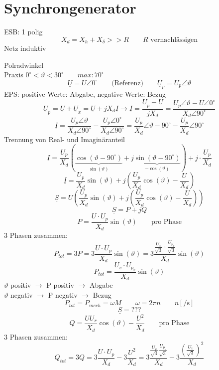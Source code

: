 \documentclass[a4,paper,fleqn]{article}
\begin{document}
\section{Synchrongenerator}
ESB: 1 polig
\[ X_d = X_h + X_\delta >> R \qquad \text{$R$ vernachlässigen} \]
Netz induktiv
\begin{figure}[h!]
\end{figure}
Polradwinkel \\
Praxis $0^\circ < \vartheta < 30^\circ \qquad max: 70^\circ$
\[ \underline{U} = U \angle 0^\circ \qquad \text{(Referenz)} \qquad \underline{U}_p = U_p \angle\vartheta \]
EPS: positive Werte: Abgabe, negative Werte: Bezug
\[ \underline{U}_p = \underline{U} + \underline{U}_x = \underline{U} + j X_d \underline{I} \to 
\underline{I} = \frac{\underline{U}_p - \underline{U}}{j X_d} = \frac{U_p \angle \vartheta - U \angle 0^\circ}{X_d \angle 90^\circ} \]
\[ \underline{I} = 
\frac{U_p \angle \vartheta}{X_d \angle 90^\circ} - \frac{U_p \angle 0^\circ}{X_d \angle 90^\circ} = 
\frac{U_p}{X_d} \angle \vartheta - 90^\circ - \frac{U_p}{X_d} \angle 90^\circ
\]
Trennung von Real- und Imaginäranteil
\[ \underline{I} = 
\frac{U_p}{X_d} (\underbrace{\cos(\vartheta - 90^\circ)}_{\sin(\vartheta)} + j \underbrace{\sin(\vartheta - 90^\circ)}_{-\cos(\vartheta)}) + j \cdot \frac{U_p}{X_d}
\]
\[ \underline{I} = \frac{U_p}{X_d} \sin(\vartheta) + j \left(\frac{U_p}{X_d} \cos(\vartheta) - \frac{U}{X_d}\right) \]
\[ \underline{S} = U\left(\frac{U_p}{X_d} \sin(\vartheta) + j \left(\frac{U_p}{X_d} \cos(\vartheta) - \frac{U}{X_d}\right)\right) \]
\[ \underline{S} = P + j Q \]
\[ P = \frac{U \cdot U_p}{X_d} \sin(\vartheta) \qquad \text{pro Phase} \]
3 Phasen zusammen:
\[ P_{tot} = 3 P = 3 \frac{U \cdot U_p}{X_d} \sin(\vartheta) = 3 \frac{\frac{U_v}{\sqrt{3}} \cdot \frac{U_{p_v}}{\sqrt{3}}}{X_d} \sin(\vartheta) \]
\[ \boxed{P_{tot} = \frac{U_v \cdot U_{p_v}}{X_d} \sin(\vartheta)} \]
$\vartheta$ positiv $\to$ P positiv $\to$ Abgabe\\
$\vartheta$ negativ $\to$ P negativ $\to$ Bezug\\
\[ P_{tot} = P_{mech} = \omega M \qquad \omega = 2 \pi n \qquad n [\si{\per\second}] \]
\[ \underline{S} = ??? \]
\[ Q = \frac{U U_r}{X_d} \cos(\vartheta) - \frac{U^2}{X_d} \qquad \text{pro Phase} \]
3 Phasen zusammen:
\[ Q_{tot} = 3 Q = 3 \frac{U \cdot U_p}{X_d} - 3 \frac{U^2}{X_d} = 
3 \frac{\frac{U_v}{\sqrt{3}} \frac{U_{p_v}}{\sqrt{3}}}{X_d} - 3 \frac{\left(\frac{U_v}{\sqrt{3}}\right)^2}{X_d} \]
\end{document}
